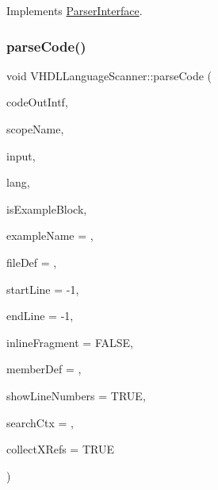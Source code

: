Implements \mbox{\hyperlink{class_parser_interface_a36c669b17b64a6e3847f27d70a5398d2}{Parser\+Interface}}.

\mbox{\label{class_v_h_d_l_language_scanner_a50e725c43fa209d4caad04c214bbb1f2}} 
\subsubsection{\texorpdfstring{parseCode()}{parseCode()}}
{\footnotesize\ttfamily void V\+H\+D\+L\+Language\+Scanner\+::parse\+Code (\begin{DoxyParamCaption}\item[{\mbox{\hyperlink{class_code_output_interface}{Code\+Output\+Interface}} \&}]{code\+Out\+Intf,  }\item[{const char $\ast$}]{scope\+Name,  }\item[{const \mbox{\hyperlink{class_q_c_string}{Q\+C\+String}} \&}]{input,  }\item[{\mbox{\hyperlink{types_8h_a9974623ce72fc23df5d64426b9178bf2}{Src\+Lang\+Ext}}}]{lang,  }\item[{bool}]{is\+Example\+Block,  }\item[{const char $\ast$}]{example\+Name = {},  }\item[{\mbox{\hyperlink{class_file_def}{File\+Def}} $\ast$}]{file\+Def = {},  }\item[{int}]{start\+Line = {\ttfamily -\/1},  }\item[{int}]{end\+Line = {\ttfamily -\/1},  }\item[{bool}]{inline\+Fragment = {\ttfamily FALSE},  }\item[{\mbox{\hyperlink{class_member_def}{Member\+Def}} $\ast$}]{member\+Def = {},  }\item[{bool}]{show\+Line\+Numbers = {\ttfamily TRUE},  }\item[{\mbox{\hyperlink{class_definition}{Definition}} $\ast$}]{search\+Ctx = {},  }\item[{bool}]{collect\+X\+Refs = {\ttfamily TRUE} }\end{DoxyParamCaption})\hspace{0.3cm}{\ttfamily [virtual]}}

